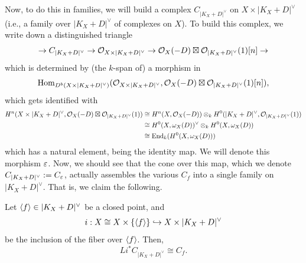 \documentclass[12pt]{article}
\begin{document}
Now, to do this in families, we will build a complex $C_{|K_X+D|^\vee}$ on $X\times |K_X+D|^\vee$ (i.e., a family over $|K_X+D|^\vee$ of complexes on $X$). To build this complex, we write down a distinguished triangle
\[\to C_{|K_X+D|^\vee} \to \mathcal{O}_{X\times |K_X+D|^\vee} \to \mathcal{O}_X(-D) \boxtimes \mathcal{O}_{|K_X+D|^\vee}(1)[n] \to\]
which is determined by (the $k$-span of) a morphism in
\[\mathrm{Hom}_{D^b(X\times |K_X+D|^\vee)}(\mathcal{O}_{X\times |K_X+D|^\vee}, \mathcal{O}_X(-D) \boxtimes \mathcal{O}_{|K_X+D|^\vee}(1)[n]),\]
which gets identified with
\begin{align}\label{family1-identifications}
    H^n(X\times|K_X+D|^\vee, \mathcal{O}_X(-D) \boxtimes \mathcal{O}_{|K_X+D|^\vee}(1)) &\cong H^n(X,\mathcal{O}_X(-D)) \otimes_k H^0(|K_X+D|^\vee, \mathcal{O}_{|K_X+D|^\vee}(1))\notag\\
    &\cong H^0(X,\omega_X(D))^\vee \otimes_k H^0(X, \omega_X(D))\notag\\
    &\cong \operatorname{End}_k(H^0(X,\omega_X(D)))
\end{align}
which has a natural element, being the identity map. We will denote this morphism $\varepsilon$. Now, we should see that the cone over this map, which we denote $C_{|K_X+D|^\vee} := C_\varepsilon$, actually assembles the various $C_f$ into a single family on $|K_X+D|^\vee$. That is, we claim the following.

\begin{prop}
    Let $\left\langle f\right\rangle \in |K_X+D|^\vee$ be a closed point, and
    \[i: X\cong X\times \{\left\langle f\right\rangle\} \hookrightarrow X \times |K_X+D|^\vee\]
    be the inclusion of the fiber over $\left\langle f\right\rangle$. Then,
    \[Li^* C_{|K_X+D|^\vee} \cong C_f.\]
\end{prop}
\end{document}
